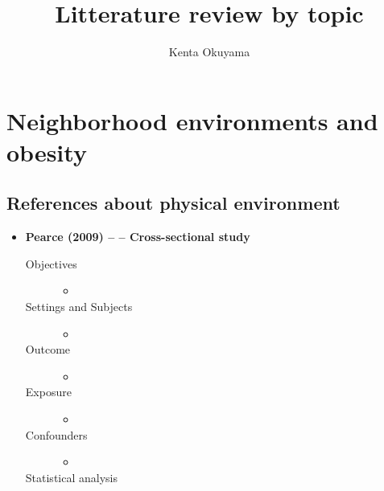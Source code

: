 \documentclass{article}
\title{Litterature review by topic}
\author{Kenta Okuyama}
\begin{document}
\maketitle
\tableofcontents
\newpage
{}


\section{Neighborhood environments and obesity}
\subsection{References about physical environment}

\begin{itemize}
		\item {\bf Pearce (2009) -- -- Cross-sectional study}
				\begin{description}
						\item[Objectives] \mbox{}\par
							\begin{itemize}
								\item 
							\end{itemize}
						\item[Settings and Subjects] \mbox{}\par
							\begin{itemize}
								\item 
							\end{itemize}
						\item[Outcome]\mbox{}\par
							\begin{itemize}
								\item 
							\end{itemize}
						\item[Exposure]\mbox{}\par
							\begin{itemize}
								\item 
							\end{itemize}
						\item[Confounders]\mbox{}\par
							\begin{itemize}
								\item 
							\end{itemize}
						\item[Statistical analysis]\mbox{}\par

\end{description}
\end{itemize}
\end{document}
